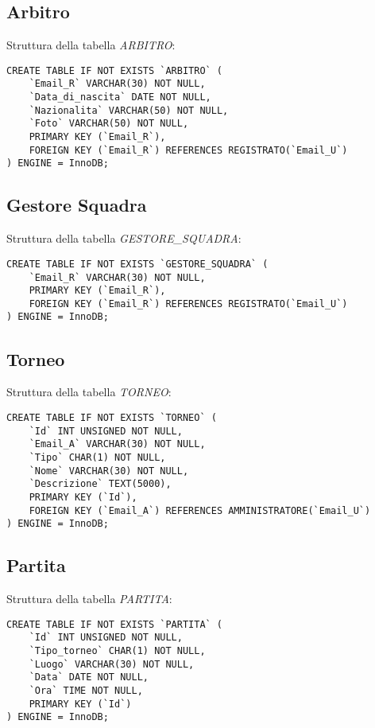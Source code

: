 \subsection{Arbitro}
Struttura della tabella \emph{ARBITRO}:

\begin{lstlisting}
CREATE TABLE IF NOT EXISTS `ARBITRO` (
	`Email_R` VARCHAR(30) NOT NULL,
	`Data_di_nascita` DATE NOT NULL,
	`Nazionalita` VARCHAR(50) NOT NULL,
	`Foto` VARCHAR(50) NOT NULL,
	PRIMARY KEY (`Email_R`),
	FOREIGN KEY (`Email_R`) REFERENCES REGISTRATO(`Email_U`)
) ENGINE = InnoDB;
\end{lstlisting}

\subsection{Gestore Squadra}
Struttura della tabella \emph{GESTORE\_SQUADRA}:

\begin{lstlisting}
CREATE TABLE IF NOT EXISTS `GESTORE_SQUADRA` (
	`Email_R` VARCHAR(30) NOT NULL,
	PRIMARY KEY (`Email_R`),
	FOREIGN KEY (`Email_R`) REFERENCES REGISTRATO(`Email_U`)
) ENGINE = InnoDB;
\end{lstlisting}

\subsection{Torneo}
Struttura della tabella \emph{TORNEO}:

\begin{lstlisting}
CREATE TABLE IF NOT EXISTS `TORNEO` (
	`Id` INT UNSIGNED NOT NULL,
	`Email_A` VARCHAR(30) NOT NULL,
	`Tipo` CHAR(1) NOT NULL,
	`Nome` VARCHAR(30) NOT NULL,
	`Descrizione` TEXT(5000),
	PRIMARY KEY (`Id`),
	FOREIGN KEY (`Email_A`) REFERENCES AMMINISTRATORE(`Email_U`)
) ENGINE = InnoDB;
\end{lstlisting}

\subsection{Partita}
Struttura della tabella \emph{PARTITA}:

\begin{lstlisting}
CREATE TABLE IF NOT EXISTS `PARTITA` (
	`Id` INT UNSIGNED NOT NULL,
	`Tipo_torneo` CHAR(1) NOT NULL,
	`Luogo` VARCHAR(30) NOT NULL,
	`Data` DATE NOT NULL,
	`Ora` TIME NOT NULL,
	PRIMARY KEY (`Id`)
) ENGINE = InnoDB;
\end{lstlisting}

